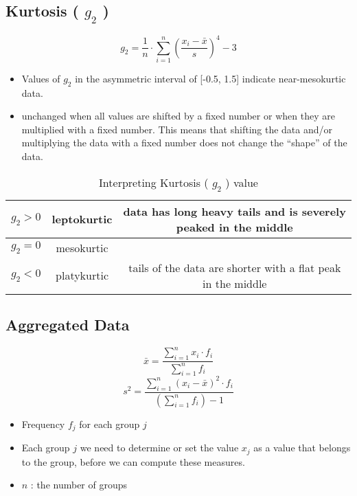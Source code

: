 \subsection{Kurtosis ( $g_2$ ) \cite{ism-1}}\label{Kurtosis}
\[
    g_2 = \displaystyle\frac{1}{n} \cdot \sum_{i=1}^{n} \left( \frac{x_i - \bar{x}}{s} \right)^4 - 3
\]

\begin{itemize}
    \item Values of $g_2$ in the asymmetric interval of [-0.5, 1.5] indicate near-mesokurtic data.
    \item unchanged when all values are shifted by a fixed number or when they are multiplied with a fixed number. This means that shifting the data and/or multiplying the data with a fixed number does not change the “shape” of the data.
\end{itemize}

\begin{table}
    \centering
    \begin{tabular}{|c|c|c|}
        \hline
        $g_2 > 0$ & leptokurtic & data has long heavy tails and is severely peaked in the middle \\ \hline
        $g_2 = 0$ & mesokurtic & \\ \hline
        $g_2 < 0$ & platykurtic & tails of the data are shorter with a flat peak in the middle \\ \hline
    \end{tabular}
    \caption{Interpreting Kurtosis ( $g_2$ ) value}
\end{table}

\subsection{Aggregated Data \cite{ism-1}}\label{Aggregated Data}
\[
    \bar{x} = \displaystyle\frac{\sum_{i=1}^{n} x_i \cdot f_i}{\sum_{i=1}^{n} f_i}
\]
\[
    s^2 = \displaystyle\frac{\sum_{i=1}^{n} (x_i - \bar{x})^2 \cdot f_i}{\left( \sum_{i=1}^{n} f_i \right) - 1}
\]

\begin{itemize}
    \item Frequency $f_j$ for each group $j$
    \item Each group $j$ we need to determine or set the value $x_j$ as a value that belongs to the group, before we can compute these measures.
    \item $n$ : the number of groups
\end{itemize}





















